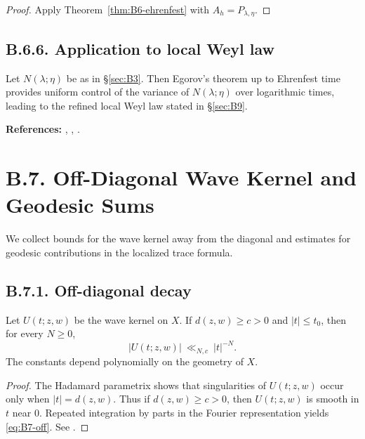 \begin{proof}
Apply Theorem~\ref{thm:B6-ehrenfest} with $A_h=P_{\lambda,\eta}$.
\end{proof}

\subsection*{B.6.6. Application to local Weyl law}

\begin{corollary}\label{cor:B6-weyl}
Let $N(\lambda;\eta)$ be as in \S\ref{sec:B3}.
Then Egorov’s theorem up to Ehrenfest time provides uniform control of the variance of $N(\lambda;\eta)$ over logarithmic times, leading to the refined local Weyl law stated in \S\ref{sec:B9}.
\end{corollary}

\medskip
\noindent\textbf{References:} \cite{Zworski}, \cite{DyatlovZworski}, \cite{Sogge}.

\section{B.7. Off-Diagonal Wave Kernel and Geodesic Sums}\label{sec:B7}

We collect bounds for the wave kernel away from the diagonal and estimates for geodesic contributions in the localized trace formula.

\subsection*{B.7.1. Off-diagonal decay}

\begin{lemma}\label{lem:B7-off}
Let $U(t;z,w)$ be the wave kernel on $X$.
If $d(z,w)\ge c>0$ and $|t|\le t_0$, then for every $N\ge 0$,
\begin{equation}\label{eq:B7-off}
|U(t;z,w)|\ \ll_{N,c}\ |t|^{-N}.
\end{equation}
The constants depend polynomially on the geometry of $X$.
\end{lemma}

\begin{proof}
The Hadamard parametrix shows that singularities of $U(t;z,w)$ occur only when $|t|=d(z,w)$.
Thus if $d(z,w)\ge c>0$, then $U(t;z,w)$ is smooth in $t$ near $0$.
Repeated integration by parts in the Fourier representation yields \eqref{eq:B7-off}.
See \cite[Ch.~11]{Zworski}.
\end{proof}

